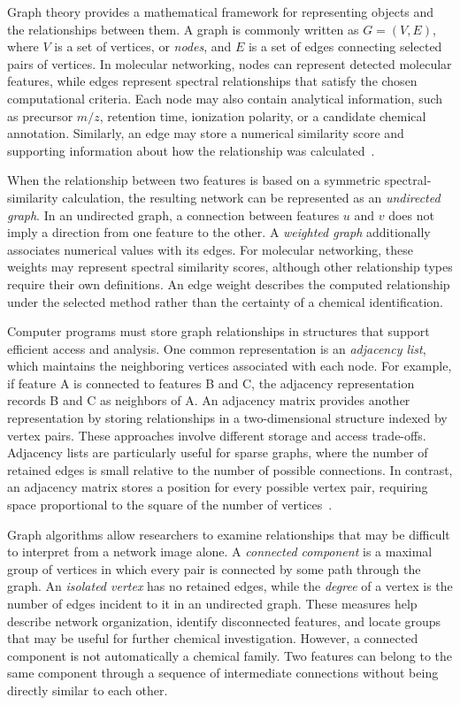         Graph theory provides a mathematical framework for representing objects and the relationships between them. A graph is commonly written as $G=(V,E)$, where $V$ is a set of vertices, or \emph{nodes}, and $E$ is a set of edges connecting selected pairs of vertices. In molecular networking, nodes can represent detected molecular features, while edges represent spectral relationships that satisfy the chosen computational criteria. Each node may also contain analytical information, such as precursor $m/z$, retention time, ionization polarity, or a candidate chemical annotation. Similarly, an edge may store a numerical similarity score and supporting information about how the relationship was calculated~\cite{Newman2003,Barabasi2016,Wang2016}.

        When the relationship between two features is based on a symmetric spectral-similarity calculation, the resulting network can be represented as an \emph{undirected graph}. In an undirected graph, a connection between features $u$ and $v$ does not imply a direction from one feature to the other. A \emph{weighted graph} additionally associates numerical values with its edges. For molecular networking, these weights may represent spectral similarity scores, although other relationship types require their own definitions. An edge weight describes the computed relationship under the selected method rather than the certainty of a chemical identification.

        Computer programs must store graph relationships in structures that support efficient access and analysis. One common representation is an \emph{adjacency list}, which maintains the neighboring vertices associated with each node. For example, if feature A is connected to features B and C, the adjacency representation records B and C as neighbors of A. An adjacency matrix provides another representation by storing relationships in a two-dimensional structure indexed by vertex pairs. These approaches involve different storage and access trade-offs. Adjacency lists are particularly useful for sparse graphs, where the number of retained edges is small relative to the number of possible connections. In contrast, an adjacency matrix stores a position for every possible vertex pair, requiring space proportional to the square of the number of vertices~\cite{Newman2003,Barabasi2016}.

        Graph algorithms allow researchers to examine relationships that may be difficult to interpret from a network image alone. A \emph{connected component} is a maximal group of vertices in which every pair is connected by some path through the graph. An \emph{isolated vertex} has no retained edges, while the \emph{degree} of a vertex is the number of edges incident to it in an undirected graph. These measures help describe network organization, identify disconnected features, and locate groups that may be useful for further chemical investigation. However, a connected component is not automatically a chemical family. Two features can belong to the same component through a sequence of intermediate connections without being directly similar to each other.

